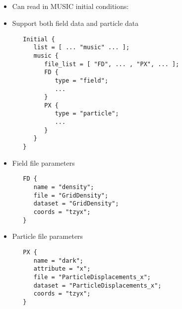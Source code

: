 \NEWSEC


\subsection{\ssRecentMusic}




%  
%
\begin{frame}[fragile,label=ss-recent-music] 
  \secframetitle{\ssRecentMusic}
  \begin{itemize}
  \item Can read in MUSIC initial conditions: 
  \item Support both field data and particle data
\small
\begin{verbatim}
   Initial {
      list = [ ... "music" ... ];
      music {
         file_list = [ "FD", ... , "PX", ... ];
         FD {
            type = "field";
            ...
         }
         PX {
            type = "particle";
            ...
         }
      }
   }
\end{verbatim}
\end{itemize}
\end{frame}

\begin{frame}[fragile,label=ss-recent-music] 
  \secframetitle{\ssRecentMusic}
  \begin{itemize}
  \item Field file parameters
    \small
  \begin{verbatim}
   FD {
      name = "density";
      file = "GridDensity";
      dataset = "GridDensity";
      coords = "tzyx";
   }
         \end{verbatim}
  \item Particle file parameters
    \small
  \begin{verbatim}
   PX {
      name = "dark";
      attribute = "x";
      file = "ParticleDisplacements_x";
      dataset = "ParticleDisplacements_x";
      coords = "tzyx";
   }
   \end{verbatim}
\end{itemize}
\end{frame}

%   

